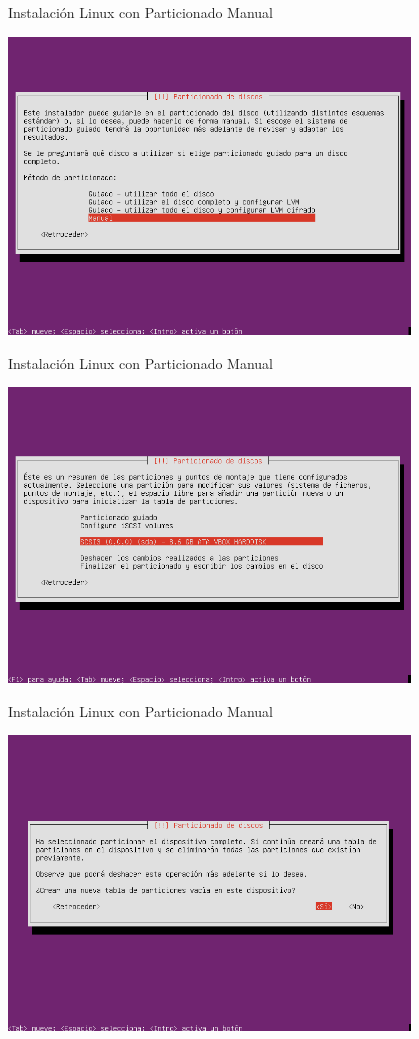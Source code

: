 \begin{frame}{Instalación Linux con Particionado Manual}
 \begin{center}
  \includegraphics[width=0.8\textwidth]{images/install2.png}
 \end{center}
\end{frame}

\begin{frame}{Instalación Linux con Particionado Manual}
 \begin{center}
  \includegraphics[width=0.8\textwidth]{images/install3.png}
 \end{center}
\end{frame}

\begin{frame}{Instalación Linux con Particionado Manual}
 \begin{center}
  \includegraphics[width=0.8\textwidth]{images/install4.png}
 \end{center}
\end{frame}

